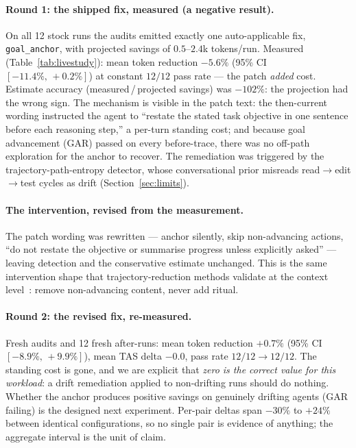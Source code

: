 \documentclass[11pt]{article}
\newcommand{\code}[1]{\texttt{#1}}
\begin{document}
\paragraph{Round 1: the shipped fix, measured (a negative result).} On all 12
stock runs the audits emitted exactly one auto-applicable fix,
\code{goal\_anchor}, with projected savings of $0.5$--$2.4$k tokens/run.
Measured (Table~\ref{tab:livestudy}): mean token reduction
$\mathbf{-5.6\%}$ (95\% CI $[-11.4\%,\,+0.2\%]$) at constant $12/12$ pass rate
--- the patch \emph{added} cost. Estimate accuracy
(measured\,/\,projected savings) was $-102\%$: the projection had the wrong
sign. The mechanism is visible in the patch text: the then-current wording
instructed the agent to ``restate the stated task objective in one sentence
before each reasoning step,'' a per-turn standing cost; and because goal
advancement (GAR) passed on every before-trace, there was no off-path
exploration for the anchor to recover. The remediation was triggered by the
trajectory-path-entropy detector, whose conversational prior misreads
read$\to$edit$\to$test cycles as drift (Section~\ref{sec:limits}).

\paragraph{The intervention, revised from the measurement.} The patch wording
was rewritten --- anchor silently, skip non-advancing actions, ``do not
restate the objective or summarise progress unless explicitly asked'' ---
leaving detection and the conservative estimate unchanged. This is the same
intervention shape that trajectory-reduction methods validate at the
context level~\cite{agentdiet,depo}: remove non-advancing content, never add
ritual.

\paragraph{Round 2: the revised fix, re-measured.} Fresh audits and 12 fresh
after-runs: mean token reduction $\mathbf{+0.7\%}$ (95\% CI
$[-8.9\%,\,+9.9\%]$), mean TAS delta $-0.0$, pass rate $12/12 \to 12/12$. The
standing cost is gone, and we are explicit that \emph{zero is the correct
value for this workload}: a drift remediation applied to non-drifting runs
should do nothing. Whether the anchor produces positive savings on genuinely
drifting agents (GAR failing) is the designed next experiment. Per-pair deltas
span $-30\%$ to $+24\%$ between identical configurations, so no single pair is
evidence of anything; the aggregate interval is the unit of claim.
\end{document}
